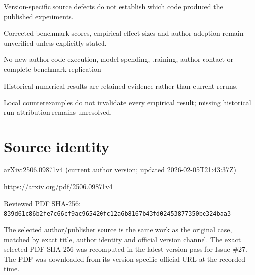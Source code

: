 \documentclass[11pt]{article}
\begin{document}
Version-specific source defects do not establish which code produced the published experiments.\par

Corrected benchmark scores, empirical effect sizes and author adoption remain unverified unless explicitly stated.\par

No new author-code execution, model spending, training, author contact or complete benchmark replication.\par

Historical numerical results are retained evidence rather than current reruns.\par

Local counterexamples do not invalidate every empirical result; missing historical run attribution remains unresolved.\par

\section*{Source identity}

arXiv:2506.09871v4 (current author version; updated 2026-02-05T21:43:37Z)

\url{https://arxiv.org/pdf/2506.09871v4}

Reviewed PDF SHA-256: \nolinkurl{839d61c86b2fe7c66cf9ac965420fc12a6b8167b43fd02453877350be324baa3}

The selected author/publisher source is the same work as the original case, matched by exact title, author identity and official version channel. The exact selected PDF SHA-256 was recomputed in the latest-version pass for Issue \#27. The PDF was downloaded from its version-specific official URL at the recorded time.
\end{document}
